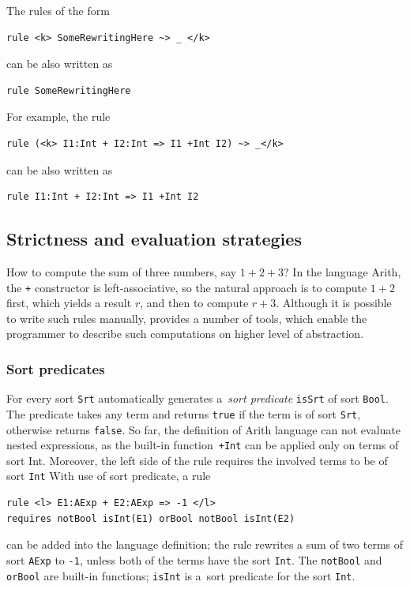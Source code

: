 \documentclass{fithesis3}
\begin{document}

The rules of the form
\begin{lstlisting}
rule <k> SomeRewritingHere ~> _ </k>
\end{lstlisting}
can be also written as
\begin{lstlisting}
rule SomeRewritingHere
\end{lstlisting}
For example, the rule
\begin{lstlisting}
rule (<k> I1:Int + I2:Int => I1 +Int I2) ~> _</k>
\end{lstlisting}
can be also written as
\begin{lstlisting}
rule I1:Int + I2:Int => I1 +Int I2
\end{lstlisting}

\subsection{Strictness and evaluation strategies}

How to compute the sum of three numbers, say $1 + 2 + 3$? In the language Arith, the \texttt{+} constructor is left-associative, so the natural approach is to compute $1 + 2$ first, which yields a result $r$, and then to compute $r + 3$. Although it is possible to write such rules manually, \K provides a number of tools, which enable the programmer to describe such computations on higher level of abstraction.

\subsubsection{Sort predicates}

For every sort \texttt{Srt} \K automatically generates a~\textit{sort predicate} \texttt{isSrt} of sort \texttt{Bool}. The predicate takes any term and returns \texttt{true} if the term is of sort \texttt{Srt}, otherwise returns \texttt{false}. So far, the definition of Arith language can not evaluate nested expressions, as the built-in function~\texttt{+Int}
can be applied only on terms of sort Int. Moreover, the left side of the rule requires the involved terms to be of sort \texttt{Int} With use of sort predicate, a rule
\begin{lstlisting}
rule <l> E1:AExp + E2:AExp => -1 </l>
requires notBool isInt(E1) orBool notBool isInt(E2)
\end{lstlisting}
can be added into the language definition; the rule rewrites a sum of two terms of sort \texttt{AExp} to \lstinline{-1}{}, unless both of the terms have the sort \texttt{Int}. The \texttt{notBool} and \texttt{orBool} are built-in functions; \texttt{isInt} is a~sort predicate for the sort \texttt{Int}.
\end{document}
